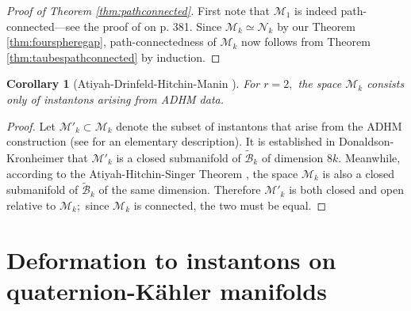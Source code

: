 \documentclass[12pt]{amsart}
\renewcommand{\1}{{\mathbf 1}}
\newcommand{\calB}{\mathcal{B}}
\newcommand{\SO}{{\mathrm{SO} }}
\newcommand{\calM}{\mathcal{M}}
\newcommand{\calN}{\mathcal{N}}
\newtheorem{cor}[thm]{Corollary}
\theoremstyle{others}
\numberwithin{equation}{section}
\begin{document}
\begin{proof}[Proof of Theorem \ref{thm:pathconnected}] First note that $\calM_1$ %
is indeed path-connected---see the proof of \cite[Proposition 6.2]{taubespathconnected} on p. 381. Since $\calM_k \simeq \calN_k$ by our Theorem \ref{thm:fourspheregap}, path-connectedness of $\calM_k$ now follows from Theorem \ref{thm:taubespathconnected} by induction.
\end{proof}



\begin{cor}[Atiyah-Drinfeld-Hitchin-Manin \cite{adhm}]\label{cor:adhm} For $r = 2,$ the space $\calM_k$ consists only of instantons arising from ADHM data. 
\end{cor}
\begin{proof} Let $\calM'_k \subset \calM_k$ denote the subset of instantons that arise from the ADHM construction (see \cite[Ch. II]{atiyahgeometry} for an elementary description). It is established in Donaldson-Kronheimer \cite[\S 3.4.2-4]{donkron} that $\calM'_k$ is a closed submanifold of $\tilde{\calB}_k$ of dimension $8k.$ Meanwhile, according to the Atiyah-Hitchin-Singer Theorem \cite{ahs}, the space $\calM_k$ is also a closed submanifold of $\tilde{\calB}_k$ of the same dimension. Therefore $\calM'_k$ is both closed and open relative to $\calM_k;$ since $\calM_k$ is connected, the two must be equal. %
\end{proof}

\vspace{10mm}

\section{Deformation to instantons on quaternion-K\"ahler manifolds}
\end{document}
